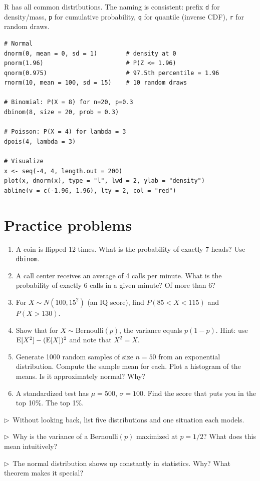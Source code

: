 \begin{codelab}
R has all common distributions. The naming is consistent: prefix \texttt{d} for density/mass, \texttt{p} for cumulative probability, \texttt{q} for quantile (inverse CDF), \texttt{r} for random draws.
\begin{lstlisting}[language=Rlang]
# Normal
dnorm(0, mean = 0, sd = 1)        # density at 0
pnorm(1.96)                       # P(Z <= 1.96)
qnorm(0.975)                      # 97.5th percentile = 1.96
rnorm(10, mean = 100, sd = 15)    # 10 random draws

# Binomial: P(X = 8) for n=20, p=0.3
dbinom(8, size = 20, prob = 0.3)

# Poisson: P(X = 4) for lambda = 3
dpois(4, lambda = 3)

# Visualize
x <- seq(-4, 4, length.out = 200)
plot(x, dnorm(x), type = "l", lwd = 2, ylab = "density")
abline(v = c(-1.96, 1.96), lty = 2, col = "red")
\end{lstlisting}
\end{codelab}

\section{Practice problems}

\begin{enumerate}
  \item A coin is flipped 12 times. What is the probability of exactly 7 heads? Use \texttt{dbinom}.
  \item A call center receives an average of 4 calls per minute. What is the probability of exactly 6 calls in a given minute? Of more than 6?
  \item For $X \sim N(100, 15^2)$ (an IQ score), find $P(85 < X < 115)$ and $P(X > 130)$.
  \item Show that for $X \sim \text{Bernoulli}(p)$, the variance equals $p(1-p)$. Hint: use $\operatorname{E}[X^2] - (\operatorname{E}[X])^2$ and note that $X^2 = X$.
  \item Generate 1000 random samples of size $n = 50$ from an exponential distribution. Compute the sample mean for each. Plot a histogram of the means. Is it approximately normal? Why?
  \item A standardized test has $\mu = 500$, $\sigma = 100$. Find the score that puts you in the top 10\%. The top 1\%.
\end{enumerate}

\begin{reflect}
$\triangleright$~Without looking back, list five distributions and one situation each models.

\smallskip
$\triangleright$~Why is the variance of a Bernoulli$(p)$ maximized at $p = 1/2$? What does this mean intuitively?

\smallskip
$\triangleright$~The normal distribution shows up constantly in statistics. Why? What theorem makes it special?
\end{reflect}
